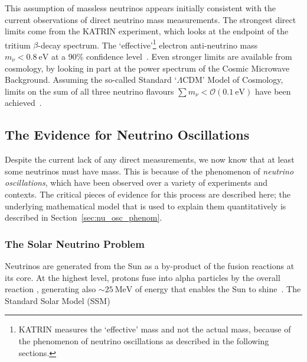 This assumption of massless neutrinos appears initially consistent with the current observations of direct neutrino mass measurements. The strongest direct limits come from the KATRIN experiment, which looks at the endpoint of the tritium $\beta$-decay spectrum. The `effective'\footnote{
    KATRIN measures the `effective' mass and not the actual mass, because of the phenomenon of neutrino oscillations as described in the following sections.
} electron anti-neutrino mass $m_{\nu} < \SI{0.8}{\eV}$ at a 90\% confidence level~\cite{}. %
Even stronger limits are available from cosmology, by looking in part at the power spectrum of the Cosmic Microwave Background. Assuming the so-called Standard `$\Lambda$CDM' Model of Cosmology, limits on the sum of all three neutrino flavours $\sum m_{\nu}<\mathcal{O}(\SI{0.1}{\eV})$ have been achieved~\cite{}. %

\subsection{The Evidence for Neutrino Oscillations}\label{sec:nu_osc_evidence}
Despite the current lack of any direct measurements, we now know that at least some neutrinos must have mass. This is because of the phenomenon of \textit{neutrino oscillations}, which have been observed over a variety of experiments and contexts. The critical pieces of evidence for this process are described here; the underlying mathematical model that is used to explain them quantitatively is described in Section~\ref{sec:nu_osc_phenom}.

\subsubsection{The Solar Neutrino Problem}
Neutrinos are generated from the Sun as a by-product of the fusion reactions at its core. At the highest level, protons fuse into alpha particles by the overall reaction , generating also $\sim\SI{25}{\MeV}$ of energy that enables the Sun to shine~\cite{}. %
The Standard Solar Model (SSM)

